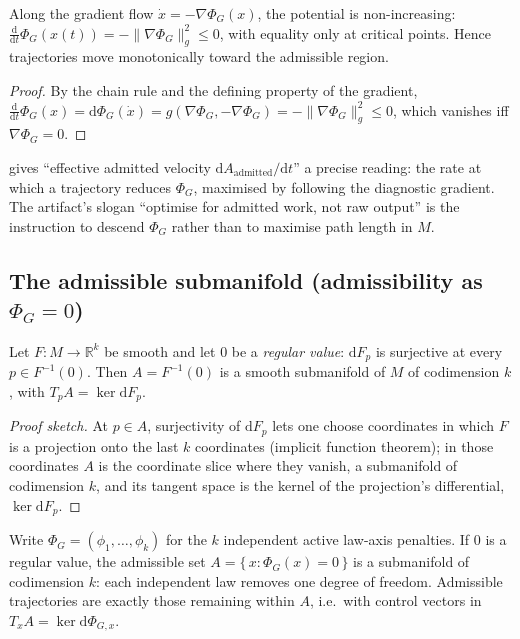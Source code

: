 \begin{proposition}
\label{prop:descent}
Along the gradient flow $\dot x=-\nabla\Phi_G(x)$, the potential is
non-increasing: $\tfrac{\mathrm d}{\mathrm dt}\Phi_G(x(t))=-\lVert\nabla\Phi_G
\rVert_g^{2}\le 0$, with equality only at critical points. Hence trajectories move
monotonically toward the admissible region.
\end{proposition}
\begin{proof}
By the chain rule and the defining property of the gradient,
$\frac{\mathrm d}{\mathrm dt}\Phi_G(x)=\mathrm d\Phi_G(\dot x)
=g(\nabla\Phi_G,-\nabla\Phi_G)=-\lVert\nabla\Phi_G\rVert_g^{2}\le 0$,
which vanishes iff $\nabla\Phi_G=0$.
\end{proof}

 gives ``effective admitted velocity $\mathrm
dA_{\text{admitted}}/\mathrm dt$'' a precise reading: the rate at which a
trajectory reduces $\Phi_G$, maximised by following the diagnostic gradient. The
artifact's slogan ``optimise for admitted work, not raw output'' is the
instruction to descend $\Phi_G$ rather than to maximise path length in $M$.

\subsection{The admissible submanifold (admissibility as \texorpdfstring{$\Phi_G=0$}{Phi=0})}
\label{sec:geo-submanifold}

\begin{theorem}
\label{thm:regval}
Let $F\colon M\to\mathbb R^{k}$ be smooth and let $0$ be a \emph{regular value}:
$\mathrm dF_p$ is surjective at every $p\in F^{-1}(0)$. Then $A=F^{-1}(0)$ is a
smooth submanifold of $M$ of codimension $k$, with $T_pA=\ker\mathrm dF_p$.
\end{theorem}
\begin{proof}[Proof sketch]
At $p\in A$, surjectivity of $\mathrm dF_p$ lets one choose coordinates in which
$F$ is a projection onto the last $k$ coordinates (implicit function theorem); in
those coordinates $A$ is the coordinate slice where they vanish, a submanifold of
codimension $k$, and its tangent space is the kernel of the projection's
differential, $\ker\mathrm dF_p$.
\end{proof}

\begin{corollary}
\label{cor:admissible}
Write $\Phi_G=(\phi_1,\dots,\phi_k)$ for the $k$ independent active law-axis
penalties. If $0$ is a regular value, the admissible set
$A=\{\,x:\Phi_G(x)=0\,\}$ is a submanifold of codimension $k$: each independent
law removes one degree of freedom. Admissible trajectories are exactly those
remaining within $A$, i.e.\ with control vectors in $T_xA=\ker\mathrm d\Phi_{G,x}$.
\end{corollary}

